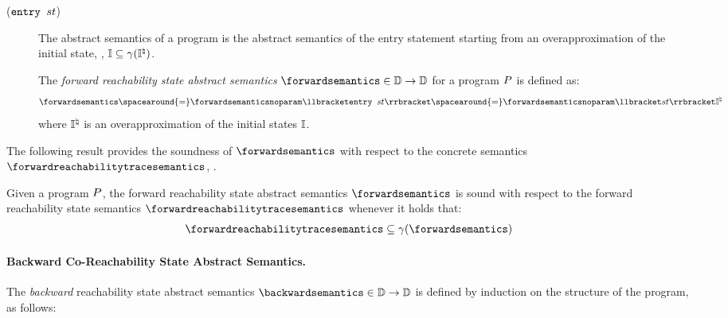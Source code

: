 \begin{description}
  \item[\normalfont ($\textup{\texttt{entry }} st$)] The abstract semantics of a program is the abstract semantics of the entry statement starting from an overapproximation of the initial state, \ie, $\mathbb{I} \subseteq \gamma(\mathbb{I}^\natural)$.
    \begin{definition}
      The \emph{forward reachability state abstract semantics} $\forwardsemantics\in\forwardtype$ for a program $P$ is defined as:
      \begin{align*}
        \forwardsemantics \spacearound{=} \forwardsemanticsnoparam \semanticsof{\progstmt} \spacearound{=} \forwardsemanticsnoparam \semanticsof{\defstmt}\abstractinitialstates
      \end{align*}
      where $\mathbb{I}^\natural$ is an overapproximation of the initial states $\mathbb{I}$.
    \end{definition}
\end{description}

The following result provides the soundness of $\forwardsemantics$ with respect to the concrete semantics $\forwardreachabilitytracesemantics$, \cf{} .

\begin{theorem}
  Given a program $P$, the forward reachability state abstract semantics $\forwardsemantics$ is sound with respect to the forward reachability state semantics $\forwardreachabilitytracesemantics$ whenever it holds that:
  \begin{align*}
    \forwardreachabilitytracesemantics \subseteq \abstractdomainconcretization(\forwardsemantics)
  \end{align*}
\end{theorem}

\paragraph{Backward Co-Reachability State Abstract Semantics.}

The \emph{backward} reachability state abstract semantics $\backwardsemantics\in\backwardtype$ is defined by induction on the structure of the program, as follows:

